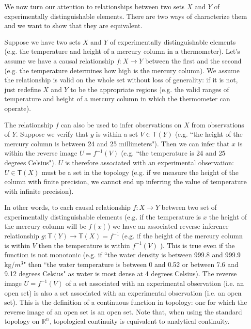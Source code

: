 \documentclass[11pt,letterpaper,fleqn]{memoir} %
\begin{document}
We now turn our attention to relationships between two sets $X$ and $Y$ of experimentally distinguishable elements. There are two ways of characterize them and we want to show that they are equivalent.

Suppose we have two sets $X$ and $Y$ of experimentally distinguishable elements (e.g. the temperature and height of a mercury column in a thermometer). Let's assume we have a causal relationship $f: X \rightarrow Y$ between the first and the second (e.g. the temperature determines how high is the mercury column). We assume the relationship is valid on the whole set without loss of generality: if it is not, just redefine $X$ and $Y$ to be the appropriate regions (e.g. the valid ranges of temperature and height of a mercury column in which the thermometer can operate).

The relationship $f$ can also be used to infer observations on $X$ from observations of $Y$. Suppose we verify that $y$ is within a set $V \in \mathsf{T}(Y)$ (e.g. ``the height of the mercury column is between 24 and 25 millimeters"). Then we can infer that $x$ is within the reverse image $U=f^{-1}(V)$ (e.g. ``the temperature is 24 and 25 degrees Celsius"). $U$ is therefore associated with an experimental observation: $U \in \mathsf{T}(X)$ must be a set in the topology (e.g. if we measure the height of the column with finite precision, we cannot end up inferring the value of temperature with infinite precision).

In other words, to each causal relationship $f: X \rightarrow Y$ between two set of experimentally distinguishable elements (e.g. if the temperature is $x$ the height of the mercury column will be $f(x)$) we have an associated reverse inference relationship $g  : \mathsf{T}(Y) \rightarrow \mathsf{T}(X) = f^{-1}$ (e.g. if the height of the mercury column is within $V$ then the temperature is within $f^{-1}(V)$ ). This is true even if the function is not monotonic (e.g. if ``the water density is between 999.8 and 999.9 kg/$m^3$" then ``the water temperature is between 0 and 0.52 or between 7.6 and 9.12 degrees Celsius" as water is most dense at 4 degrees Celsius).  The reverse image $U=f^{-1}(V)$ of a set associated with an experimental observation (i.e. an open set) is also a set associated with an experimental observation (i.e. an open set). This is the definition of a continuous function in topology: one for which the reverse image of an open set is an open set. Note that, when using the standard topology on $\mathbb{R}^n$, topological continuity is equivalent to analytical continuity.
\end{document}
